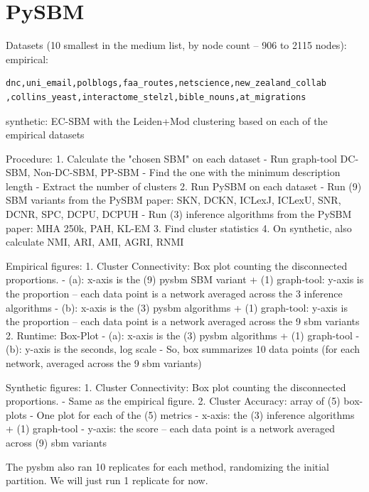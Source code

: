 \documentclass[aps,pre,superscriptaddress]{revtex4}
\begin{document}
\section{PySBM}

Datasets (10 smallest in the medium list, by node count -- 906 to 2115 nodes):
empirical: 
\begin{verbatim}
dnc,uni_email,polblogs,faa_routes,netscience,new_zealand_collab
,collins_yeast,interactome_stelzl,bible_nouns,at_migrations    
\end{verbatim}

synthetic: EC-SBM with the Leiden+Mod clustering based on each of the empirical datasets

Procedure:
1. Calculate the "chosen SBM" on each dataset
    - Run graph-tool DC-SBM, Non-DC-SBM, PP-SBM
    - Find the one with the minimum description length
    - Extract the number of clusters
2. Run PySBM on each dataset
    - Run (9) SBM variants from the PySBM paper: SKN, DCKN, ICLexJ, ICLexU, SNR, DCNR, SPC, DCPU, DCPUH
    - Run (3) inference algorithms from the PySBM paper: MHA 250k, PAH, KL-EM
3. Find cluster statistics
4. On synthetic, also calculate NMI, ARI, AMI, AGRI, RNMI

Empirical figures:
1. Cluster Connectivity: Box plot counting the disconnected proportions.
    - (a): x-axis is the (9) pysbm SBM variant + (1) graph-tool: y-axis is the proportion -- each data point is a network averaged across the 3 inference algorithms
    - (b): x-axis is the (3) pysbm algorithms + (1) graph-tool:  y-axis is the proportion -- each data point is a network averaged across the 9 sbm variants
2. Runtime: Box-Plot
    - (a): x-axis is the (3) pysbm algorithms + (1) graph-tool
    - (b): y-axis is the seconds, log scale
    - So, box summarizes 10 data points (for each network, averaged across the 9 sbm variants)

Synthetic figures:
1. Cluster Connectivity: Box plot counting the disconnected proportions.
    - Same as the empirical figure.
2. Cluster Accuracy: array of (5) box-plots
    - One plot for each of the (5) metrics
    - x-axis: the (3) inference algorithms  + (1) graph-tool
    - y-axis: the score -- each data point is a network averaged across (9) sbm variants

The pysbm also ran 10 replicates for each method, randomizing the initial partition.
We will just run 1 replicate for now.
\end{document}
